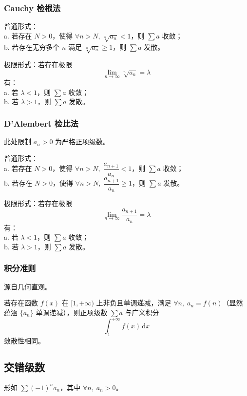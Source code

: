 \documentclass[12pt, a4paper, UTF8, openany]{ctexbook}
\newcommand{\dif}{\mathrm{d}}
\newcommand{\sdif}{\,\dif}
\begin{document}
        \subsubsection{Cauchy 检根法}
        普通形式：\\
        a. 若存在 $N > 0$，使得 $\forall n > N, \, \sqrt[n]{a_n} < 1$，则 $\sum a$ 收敛；\\
        b. 若存在无穷多个 $n$ 满足 $\sqrt[n]{a_n} \geqslant 1$，则 $\sum a$ 发散。

        极限形式：若存在极限
        $$\lim_{n \to \infty} \sqrt[n]{a_n} = \lambda$$
        有：\\
        a. 若 $\lambda < 1$，则 $\sum a$ 收敛；\\
        b. 若 $\lambda > 1$，则 $\sum a$ 发散。

        \subsubsection{D'Alembert 检比法}
        此处限制 $a_n > 0$ 为严格正项级数。

        普通形式：\\
        a. 若存在 $N > 0$，使得 $\forall n > N, \; \dfrac{a_{n + 1}}{a_n} < 1$，则 $\sum a$ 收敛；\\
        b. 若存在 $N > 0$，使得 $\forall n > N, \; \dfrac{a_{n + 1}}{a_n} \geqslant 1$，则 $\sum a$ 发散。

        极限形式：若存在极限
        $$\lim_{n \to \infty} \frac{a_{n + 1}}{a_n} = \lambda$$
        有：\\
        a. 若 $\lambda < 1$，则 $\sum a$ 收敛；\\
        b. 若 $\lambda > 1$，则 $\sum a$ 发散。

        \subsubsection{积分准则}
        源自几何直观。

        若存在函数 $f(x)$ 在 $[1, +\infty)$ 上非负且单调递减，满足 $\forall n, \; a_n = f(n)$（显然蕴涵 $\{a_n\}$ 单调递减），则正项级数 $\sum a$ 与广义积分
        $$\int_{1}^{+\infty} f(x)\sdif x$$
        敛散性相同。

        \subsection{交错级数}
        形如 $\sum (-1)^n a_n$，其中 $\forall n, \; a_n > 0$。
\end{document}

